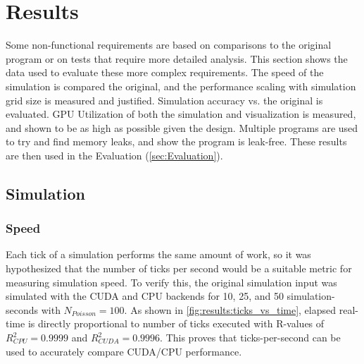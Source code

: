 
\newcommand{\npoisson}{N_{Poisson}}

\chapter{Results}\label{sec:Results}
Some non-functional requirements are based on comparisons to the original program or on tests that require more detailed analysis.
This section shows the data used to evaluate these more complex requirements.
The speed of the simulation is compared the original, and the performance scaling with simulation grid size is measured and justified.
Simulation accuracy vs. the original is evaluated.
GPU Utilization of both the simulation and visualization is measured, and shown to be as high as possible given the design.
Multiple programs are used to try and find memory leaks, and show the program is leak-free.
These results are then used in the Evaluation (\cref{sec:Evaluation}).

\pagebreak
\section{Simulation}

\subsection{Speed}\label{sec:Results:Sim:Speed}



Each tick of a simulation performs the same amount of work, so it was hypothesized that the number of ticks per second would be a suitable metric for measuring simulation speed.
To verify this, the original simulation input was simulated with the CUDA and CPU backends for 10, 25, and 50 simulation-seconds with $\npoisson = 100$.
As shown in \cref{fig:results:ticks_vs_time}, elapsed real-time is directly proportional to number of ticks executed with R-values of $R^2_{CPU} = 0.9999$ and $R^2_{CUDA} = 0.9996$.
This proves that ticks-per-second can be used to accurately compare CUDA/CPU performance.




